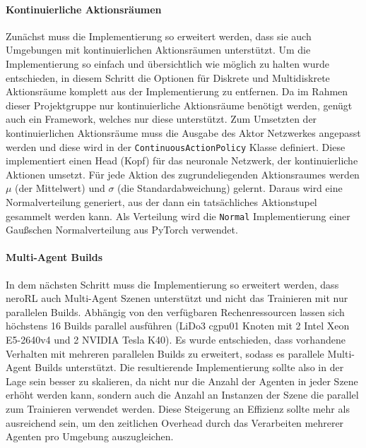 \paragraph{Kontinuierliche Aktionsräumen}
Zunächst muss die Implementierung so erweitert werden, dass sie auch Umgebungen mit kontinuierlichen Aktionsräumen unterstützt. 
Um die Implementierung so einfach und übersichtlich wie möglich zu halten wurde entschieden, in diesem Schritt die Optionen für Diskrete und Multidiskrete Aktionsräume komplett aus der Implementierung zu entfernen. Da im Rahmen dieser Projektgruppe nur kontinuierliche Aktionsräume benötigt werden, genügt auch ein Framework, welches nur diese unterstützt. Zum Umsetzten der kontinuierlichen Aktionsräume muss die Ausgabe des Aktor Netzwerkes angepasst werden und diese wird in der \texttt{ContinuousActionPolicy} Klasse definiert. Diese implementiert einen Head (Kopf) für das neuronale Netzwerk, der kontinuierliche Aktionen umsetzt. Für jede Aktion des zugrundeliegenden Aktionsraumes werden $\mu$ (der Mittelwert) und $\sigma$ (die Standardabweichung) gelernt. Daraus wird eine Normalverteilung generiert, aus der dann ein tatsächliches Aktionstupel gesammelt werden kann. Als Verteilung wird die \texttt{Normal} Implementierung einer Gaußschen Normalverteilung aus PyTorch verwendet.

\paragraph{Multi-Agent Builds}
In dem nächsten Schritt muss die Implementierung so erweitert werden, dass neroRL auch Multi-Agent Szenen unterstützt und nicht das Trainieren mit nur parallelen Builds.
Abhängig von den verfügbaren Rechenressourcen lassen sich höchstens 16 Builds parallel ausführen (LiDo3 cgpu01 Knoten mit 2 Intel Xeon E5-2640v4 und 2 NVIDIA Tesla K40). 
Es wurde entschieden, dass vorhandene Verhalten mit mehreren parallelen Builds zu erweitert, sodass es parallele Multi-Agent Builds unterstützt. 
Die resultierende Implementierung sollte also in der Lage sein besser zu skalieren, da nicht nur die Anzahl der Agenten in jeder Szene erhöht werden kann, sondern auch die Anzahl an Instanzen der Szene die parallel zum Trainieren verwendet werden. Diese Steigerung an Effizienz sollte mehr als ausreichend sein, um den zeitlichen Overhead durch das Verarbeiten mehrerer Agenten pro Umgebung auszugleichen.

